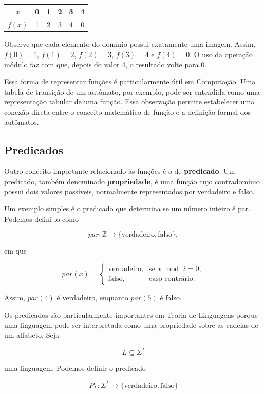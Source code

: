 \documentclass[
  brazilian,
  letterpaper,
]{book}
\theoremstyle{plain}
\theoremstyle{definition}
\theoremstyle{remark}
\begin{document}
\begin{longtable*}[]{|c|c|c|c|c|c|}
\toprule\noalign{}
\(x\) & 0 & 1 & 2 & 3 & 4 \\
\midrule\noalign{}
\endhead
\bottomrule\noalign{}
\endlastfoot
\(f(x)\) & 1 & 2 & 3 & 4 & 0 \\
\end{longtable*}

Observe que cada elemento do domínio possui exatamente uma imagem.
Assim, \(f(0)=1\), \(f(1)=2\), \(f(2)=3\), \(f(3)=4\) e \(f(4)=0\). O
uso da operação módulo faz com que, depois do valor \(4\), o resultado
volte para \(0\).

Essa forma de representar funções é particularmente útil em Computação.
Uma tabela de transição de um autômato, por exemplo, pode ser entendida
como uma representação tabular de uma função. Essa observação permite
estabelecer uma conexão direta entre o conceito matemático de função e a
definição formal dos autômatos.

\subsection{Predicados}\label{predicados}

Outro conceito importante relacionado às funções é o de
\textbf{predicado}. Um predicado, também denominado
\textbf{propriedade}, é uma função cujo contradomínio possui dois
valores possíveis, normalmente representados por verdadeiro e falso.

Um exemplo simples é o predicado que determina se um número inteiro é
par. Podemos defini-lo como

\[
par:\mathbb{Z}\rightarrow\{\text{verdadeiro},\text{falso}\},
\]

em que

\[
par(x)=
\begin{cases}
\text{verdadeiro}, & \text{se }x\bmod 2=0,\\
\text{falso}, & \text{caso contrário}.
\end{cases}
\]

Assim, \(par(4)\) é verdadeiro, enquanto \(par(5)\) é falso.

Os predicados são particularmente importantes em Teoria de Linguagens
porque uma linguagem pode ser interpretada como uma propriedade sobre as
cadeias de um alfabeto. Seja

\[
L\subseteq\Sigma^*
\]

uma linguagem. Podemos definir o predicado

\[
P_L:\Sigma^*\rightarrow\{\text{verdadeiro},\text{falso}\}
\]
\end{document}
